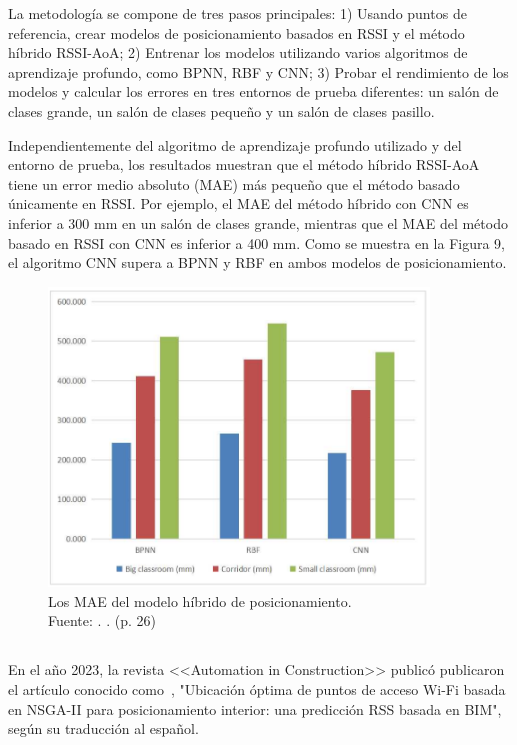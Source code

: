 La metodología se compone de tres pasos principales: 1) Usando puntos de referencia, crear modelos de posicionamiento basados en RSSI y el método híbrido RSSI-AoA; 2) Entrenar los modelos utilizando varios algoritmos de aprendizaje profundo, como BPNN, RBF y CNN; 3) Probar el rendimiento de los modelos y calcular los errores en tres entornos de prueba diferentes: un salón de clases grande, un salón de clases pequeño y un salón de clases pasillo.

Independientemente del algoritmo de aprendizaje profundo utilizado y del entorno de prueba, los resultados muestran que el método híbrido RSSI-AoA tiene un error medio absoluto (MAE) más pequeño que el método basado únicamente en RSSI. Por ejemplo, el MAE del método híbrido con CNN es inferior a 300 mm en un salón de clases grande, mientras que el MAE del método basado en RSSI con CNN es inferior a 400 mm. Como se muestra en la Figura 9, el algoritmo CNN supera a BPNN y RBF en ambos modelos de posicionamiento.

\begin{figure}[!ht]
	\begin{center}
		\includegraphics[width=0.90\textwidth]{2/figures/cai2023.png}
		\caption[Los MAE del modelo híbrido de posicionamiento]{Los MAE del modelo híbrido de posicionamiento.\\
			Fuente: \cite{pr_cai2023precisewifi}. . (p. 26)}
		\label{2:fig117}
	\end{center}
\end{figure}

\subsection{}
En el año 2023, la revista <<Automation in Construction>> publicó \cite{pr_hosseini2023NSGAIIap} publicaron el artículo conocido como , "Ubicación óptima de puntos de acceso Wi-Fi basada en NSGA-II para posicionamiento interior: una predicción RSS basada en BIM", según su traducción al español.


